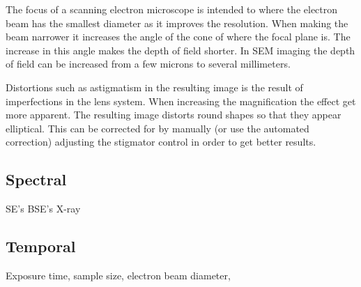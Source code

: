 The focus of a scanning electron microscope is intended to where the electron beam has the smallest diameter as it improves the resolution. When making the beam narrower it increases the angle of the cone of where the focal plane is. The increase in this angle makes the depth of field shorter. In SEM imaging the depth of field can be increased from a few microns to several millimeters. 


Distortions such as astigmatism in the resulting image is the result of imperfections in the lens system. When increasing the magnification the effect get more apparent. The resulting image distorts round shapes so that they appear elliptical. This can be corrected for by manually (or use the automated correction) adjusting the stigmator control in order to get better results. 

\subsection*{Spectral}

SE's BSE's X-ray

\subsection*{Temporal}
Exposure time, sample size, electron beam diameter, 






